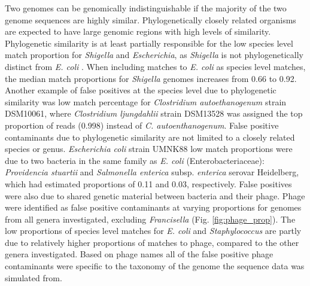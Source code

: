 \documentclass[fleqn,10pt,lineno]{wlpeerj}\usepackage[]{graphicx}\usepackage[]{color}
\begin{document}
Two genomes can be genomically indistinguishable if the majority of the two genome sequences are highly similar.
Phylogenetically closely related organisms are expected to have large genomic regions with high levels of similarity.
Phylogenetic similarity is at least partially responsible for the low species level match proportion for  \textit{Shigella} and \textit{Escherichia}, as \textit{Shigella} is not phylogenetically distinct from \textit{E. coli} \citep{lan2002escherichia}.
When including matches to \textit{E. coli} as species level matches, the median match proportions for \textit{Shigella} genomes increases from 0.66 to 0.92.
Another example of false positives at the species level due to phylogenetic similarity was low match percentage for \textit{Clostridium autoethanogenum} strain DSM10061, where \textit{Clostridium ljungdahlii} strain DSM13528 was assigned the top proportion of reads (0.998) instead of \textit{C. autoenthanogenum}.
False positive contaminants due to phylogenetic similarity are not limited to a closely related species or genus.
\textit{Escherichia coli} strain UMNK88 low match proportions were due to two bacteria in the same family as \textit{E. coli}
(Enterobacteriaceae): \textit{Providencia stuartii} and \textit{Salmonella enterica} subsp. \textit{enterica} serovar Heidelberg, which had estimated proportions of 0.11 and 0.03, respectively.
False positives were also due to shared genetic material between bacteria and their phage.
Phage were identified as false positive contaminants at varying proportions for genomes from all genera investigated, excluding \textit{Francisella} (Fig. \ref{fig:phage_prop}).
The low proportions of species level matches for \textit{E. coli} and \textit{Staphylococcus} are partly due to relatively higher proportions of matches to phage, compared to the other genera investigated.
Based on phage names all of the false positive phage contaminants were specific to the taxonomy of the genome the sequence data was simulated from.
\end{document}
